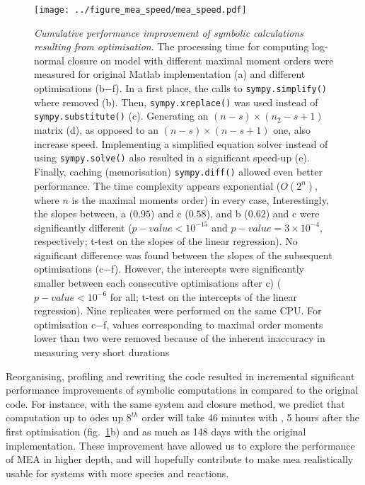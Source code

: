 \begin{figure}[tbh]

\texttt{[image: ../figure\_mea\_speed/mea\_speed.pdf]}
\caption{\emph{Cumulative performance improvement of symbolic calculations resulting from optimisation}.
The processing time for computing log-normal closure on \pft{} model with different maximal moment orders were measured for original Matlab implementation (a) and different optimisations (b$-$f).
In a first place, the calls to \texttt{sympy.simplify()} where removed (b). 
Then, \texttt{sympy.xreplace()} was used instead of \texttt{sympy.substitute()} (c). 
Generating an $(n-s) \times (n_2-s + 1)$ matrix (d), as opposed to an $(n-s) \times (n-s + 1)$ one, also increase speed.
Implementing a simplified equation solver instead of using \texttt{sympy.solve()} also resulted in a significant speed-up (e). Finally, caching (memorisation) \texttt{sympy.diff()} allowed even better performance.
The time complexity appears exponential ($O(2^n)$, where $n$ is the maximal moments order) in every case, 
Interestingly, the slopes between, a ($0.95$) and c ($0.58$), and b ($0.62$) and c were significantly different ($p-value <10^{-15}$ and $p-value = 3 \times 10^{-4}$, respectively; t-test on the slopes of the linear regression). 
No significant difference was found between the slopes of the subsequent optimisations (c$-$f). 
However, the intercepts were significantly smaller between each consecutive optimisations after c) ($p-value < 10^{-6}$ for all; t-test on the intercepts of the linear regression).
Nine replicates were performed on the same CPU. For optimisation c$-$f, values corresponding to maximal order moments lower than two were removed because of the inherent inaccuracy in measuring very short durations}
\label{fig:mea_speed}
\end{figure}



Reorganising, profiling and rewriting the code resulted in incremental significant performance improvements of symbolic computations in \means{} compared to the original \mat{} code.
For instance, with the same \pft{} system and closure method, 
we predict that computation up to \gls{ode}s up $8^{th}$ order will take 46 minutes with \means{}, 5 hours after the first optimisation (fig.~\ref{fig:mea_speed}b) and as much as 148 days with the original implementation.
These improvement have allowed us to explore the performance of MEA in higher depth, and will hopefully contribute to make \gls{mea} realistically usable for systems with more species and reactions.

